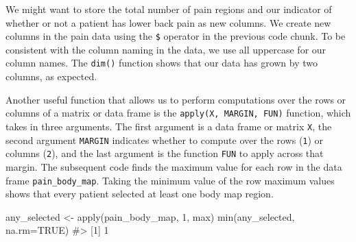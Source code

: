 \documentclass[
  letterpaper,
]{latex/krantz}
\makeatletter
\newenvironment{Shaded}{\begin{snugshade}}{\end{snugshade}}
\newcommand{\AttributeTok}[1]{\textcolor[rgb]{0.40,0.45,0.13}{#1}}
\newcommand{\CommentTok}[1]{\textcolor[rgb]{0.37,0.37,0.37}{#1}}
\newcommand{\ConstantTok}[1]{\textcolor[rgb]{0.56,0.35,0.01}{#1}}
\newcommand{\DecValTok}[1]{\textcolor[rgb]{0.68,0.00,0.00}{#1}}
\newcommand{\FunctionTok}[1]{\textcolor[rgb]{0.28,0.35,0.67}{#1}}
\newcommand{\NormalTok}[1]{\textcolor[rgb]{0.00,0.23,0.31}{#1}}
\newcommand{\OtherTok}[1]{\textcolor[rgb]{0.00,0.23,0.31}{#1}}
\newcommand{\SpecialCharTok}[1]{\textcolor[rgb]{0.37,0.37,0.37}{#1}}
\newenvironment{kframe}{%
\medskip{}
\setlength{\fboxsep}{.8em}
 \def\at@end@of@kframe{}%
 \ifinner\ifhmode%
  \def\at@end@of@kframe{\end{minipage}}%
  \begin{minipage}{\columnwidth}%
 \fi\fi%
 \def\FrameCommand##1{\hskip\@totalleftmargin \hskip-\fboxsep
 \colorbox{shadecolor}{##1}\hskip-\fboxsep
     \hskip-\linewidth \hskip-\@totalleftmargin \hskip\columnwidth}%
 \MakeFramed {\advance\hsize-\width
   \@totalleftmargin\z@ \linewidth\hsize
   \@setminipage}}%
 {\par\unskip\endMakeFramed%
 \at@end@of@kframe}
\renewenvironment{Shaded}{\begin{kframe}}{\end{kframe}}
\makeatother
\begin{document}
\begin{Shaded}
\end{Shaded}

We might want to store the total number of pain regions and our
indicator of whether or not a patient has lower back pain as new
columns. We create new columns in the pain data using the \texttt{\$}
operator in the previous code chunk. To be consistent with the column
naming in the data, we use all uppercase for our column names. The
\texttt{dim()} function shows that our data has grown by two columns, as
expected.

\begin{Shaded}
\end{Shaded}

Another useful function that allows us to perform computations over the
rows or columns of a matrix or data frame is the
\texttt{apply(X,\ MARGIN,\ FUN)}
function, which takes in
three arguments. The first argument is a data frame or matrix
\texttt{X}, the second argument \texttt{MARGIN} indicates whether to
compute over the rows (\texttt{1}) or columns (\texttt{2}), and the last
argument is the function \texttt{FUN} to apply across that margin. The
subsequent code finds the maximum value for each row in the data frame
\texttt{pain\_body\_map}. Taking the minimum value of the row maximum
values shows that every patient selected at least one body map region.

\begin{Shaded}
\begin{Highlighting}[]
\NormalTok{any\_selected }\OtherTok{\textless{}{-}} \FunctionTok{apply}\NormalTok{(pain\_body\_map, }\DecValTok{1}\NormalTok{, max)}
\FunctionTok{min}\NormalTok{(any\_selected, }\AttributeTok{na.rm=}\ConstantTok{TRUE}\NormalTok{)}
\CommentTok{\#\textgreater{} [1] 1}
\end{Highlighting}
\end{Shaded}
\end{document}
